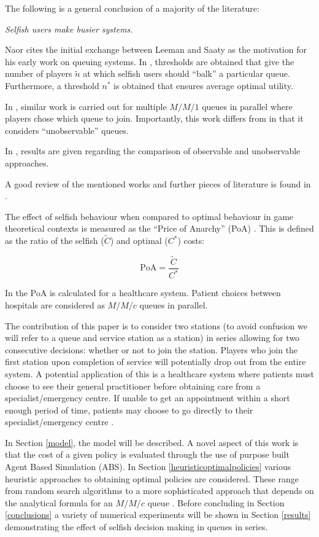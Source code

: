 \documentclass[12pt]{article}
\newcommand{\PoA}{\text{PoA}}
\begin{document}
The following is a general conclusion of a majority of the literature:

\begin{center}
\textit{Selfish users make busier systems.}
\end{center}

Naor cites the initial exchange between Leeman and Saaty as the motivation for his early work on queuing systems.
In \cite{naor1969regulation}, thresholds are obtained that give the number of players $\tilde n$ at which selfish users should ``balk'' a particular queue.
Furthermore, a threshold $n^*$ is obtained that ensures average optimal utility.

In \cite{bell1983individual}, similar work is carried out for multiple $M/M/1$ queues in parallel where players chose which queue to join.
Importantly, this work differs from \cite{naor1969regulation} in that it considers ``unobservable'' queues.

In \cite{knight2012comparisons}, results are given regarding the comparison of observable and unobservable approaches.

A good review of the mentioned works and further pieces of literature is found in \cite{hassin2003queue}.

The effect of selfish behaviour when compared to optimal behaviour in game theoretical contexts is measured as the ``Price of Anarchy'' (PoA) \cite{koutsoupias2009worst, roughgarden2002bad}.
This is defined as the ratio of the selfish ($\tilde C$) and optimal ($C^*$) costs:

$$
\PoA = \frac{\tilde C}{C^*}
$$

In \cite{knight2013selfish} the PoA is calculated for a healthcare system.
Patient choices between hospitals are considered as $M/M/c$ queues in parallel.

The contribution of this paper is to consider two stations (to avoid confusion we will refer to a queue and service station as a station) in series allowing for two consecutive decisions: whether or not to join the station.
Players who join the first station upon completion of service will potentially drop out from the entire system.
A potential application of this is a healthcare system where patients must choose to see their general practitioner before obtaining care from a specialist/emergency centre.
If unable to get an appointment within a short enough period of time, patients may choose to go directly to their specialist/emergency centre \cite{Mail_millions}.

In Section \ref{model}, the model will be described.
A novel aspect of this work is that the cost of a given policy is evaluated through the use of purpose built Agent Based Simulation (ABS).
In Section \ref{heuristicoptimalpolicies} various heuristic approaches to obtaining optimal policies are considered.
These range from random search algorithms to a more sophisticated approach that depends on the analytical formula for an $M/M/c$ queue \cite{stewart2009probability}.
Before concluding in Section \ref{conclusions} a variety of numerical experiments will be shown in Section \ref{results} demonstrating the effect of selfish decision making in queues in series.
\end{document}
